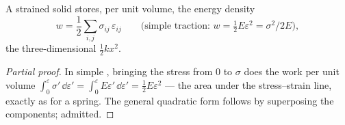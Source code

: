 \begin{proposition}\label{prop:b3:continuum-elasticity:energy}
A strained solid stores, per unit volume, the energy density
\[
w = \frac12\sum_{i,j}\sigma_{ij}\,\varepsilon_{ij}
\qquad\text{(simple traction: } w = \tfrac12 E\varepsilon^2 =
\sigma^2/2E\text{)} ,
\]
the three-dimensional $\tfrac12 kx^2$.
\end{proposition}

\begin{proof}[Partial proof]
In simple , bringing the stress from $0$ to $\sigma$ does the
work per unit volume $\int_0^\varepsilon\sigma'\,\dd\varepsilon' =
\int_0^\varepsilon E\varepsilon'\,\dd\varepsilon' = \tfrac12
E\varepsilon^2$ --- the area under the stress--strain line, exactly as
for a spring. The general quadratic form follows by superposing the
components; admitted.
\end{proof}

